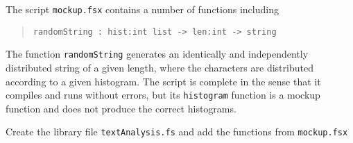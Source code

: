 \label{markov1}
The script \lstinline[language=console]{mockup.fsx} contains a number
of functions including
\begin{quote}
  \mbox{\lstinline!randomString : hist:int list -> len:int -> string!}
\end{quote}
The function \lstinline{randomString} generates an identically and
independently distributed string of a given length, where the
characters are distributed according to a given histogram. The script
is complete in the sense that it compiles and runs without errors, but
its \lstinline{histogram} function is a mockup function and does not
produce the correct histograms.

Create the library file \lstinline{textAnalysis.fs} and add the functions
from \lstinline{mockup.fsx}

